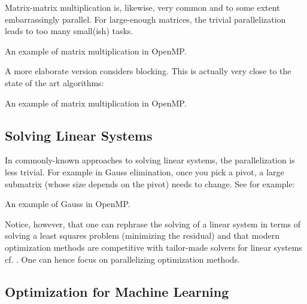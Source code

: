Matrix-matrix multiplication is, likewise, very common and to some extent 
embarrassingly parallel. For large-enough matrices, the trivial parallelization
leads to too many small(ish) tasks. 

\begin{codebox}[breakable]{}
\footnotesize An example of matrix multiplication in OpenMP.
\tcblower
{}
\end{codebox}

A more elaborate version considers blocking. This is actually very 
close to the state of the art algorithms:

\begin{codebox}[breakable]{}
\footnotesize An example of matrix multiplication in OpenMP.
\tcblower
{}
\end{codebox}


\subsection{Solving Linear Systems}

In commonly-known approaches to solving linear systems, 
the parallelization is less trivial. For example in Gauss
elimination, once you pick a pivot, a large submatrix 
(whose size depends on the pivot) needs to change. 
See for example:

\begin{codebox}[breakable]{}
\footnotesize An example of Gauss in OpenMP.
\tcblower
{}
\end{codebox}

Notice, however, that one can rephrase the solving of 
a linear system in terms of solving a least squares
problem (minimizing the residual) and that modern 
optimization methods are competitive with tailor-made 
solvers for linear systems cf. \cite{gower2015randomized}.
One can hence focus on parallelizing optimization methods.
 

\subsection{Optimization for Machine Learning}

